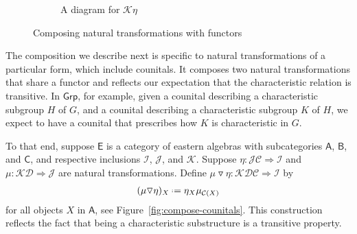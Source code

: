 \documentclass{amsart}
\newcommand{\Cat}[1]{\mathsf{#1}}
\newcommand{\cat}[1]{\Cat{#1}}
\newcommand{\acat}[1]{\mathsf{#1}}
\numberwithin{lstfloat}{section}
\newcommand{\defeq}{\mathrel{\hstretch{.13}{=}\hspace{.2ex}{=}}}
\newcommand{\func}[1]{\mathcal{#1}}
\newcommand{\fC}{\func{C}}
\newcommand{\fD}{\func{D}}
\newcommand{\fI}{\func{I}}
\newcommand{\fJ}{\func{J}}
\theoremstyle{definition}
\theoremstyle{remark}
\numberwithin{equation}{section}
\begin{document}
\begin{figure}[!htbp]
\begin{subfigure}[t]{0.49\textwidth}
    \caption{A diagram for $\func{K}\eta$}
    \label{fig:K-eta}
  \end{subfigure}
  \caption{Composing natural transformations with functors}
  \label{fig:nat-trans-functor}
\end{figure}

The composition we describe next is specific to natural transformations of a
particular form, which include counitals. It composes two natural
transformations that share a functor and reflects our expectation that the
characteristic relation is transitive. In $\cat{Grp}$, for example,  given a
counital describing a characteristic subgroup $H$ of $G$, and a counital
describing a characteristic subgroup $K$ of $H$, we expect to have a counital
that prescribes how $K$ is characteristic in $G$. 


To that end, suppose $\acat{E}$ is a category
of eastern algebras with subcategories $\acat{A}$, $\acat{B}$, and $\acat{C}$,
and respective inclusions $\func{I}$, $\func{J}$, and $\func{K}$. Suppose
$\eta:\fJ\fC\Rightarrow \fI$ and $\mu:\func{K}\fD \Rightarrow \fJ$ are
natural transformations. Define $\mu\triangledown \eta :
\func{KDC} \Rightarrow \func{I}$ by
\begin{align*} 
  (\mu\triangledown\eta)_X \defeq \eta_{X}\mu_{\fC(X)}
\end{align*} 
for all objects $X$ in $\acat{A}$, see  Figure~\ref{fig:compose-counitals}. This
construction reflects the fact that being a characteristic substructure is a
transitive property. 
\end{document}

